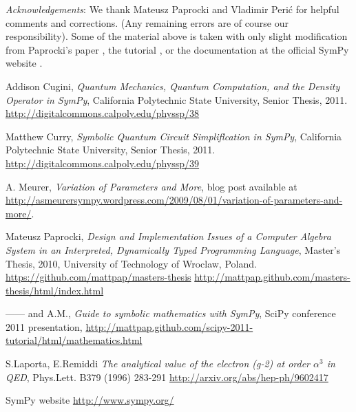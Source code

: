 \documentclass[12pt]{article}
\def\AM{A.M.}
\begin{document}
\noindent
{\it Acknowledgements}:
We thank Mateusz Paprocki and Vladimir Peri\'c
for helpful comments and corrections. (Any remaining errors are of course our
responsibility). Some of the material above is taken
with only slight modification from Paprocki's paper
\cite{P}, the tutorial \cite{PM}, or the documentation at the official SymPy website
\cite{S}.



\begin{thebibliography}{99}

Addison Cugini,
{\it Quantum Mechanics, Quantum Computation, and the Density Operator in SymPy},
California Polytechnic State University, Senior Thesis, 2011.
\newline
\url{http://digitalcommons.calpoly.edu/physsp/38}

Matthew Curry,
{\it Symbolic Quantum Circuit Simpliflcation in SymPy},
California Polytechnic State University, Senior Thesis, 2011.
\newline
\url{http://digitalcommons.calpoly.edu/physsp/39}

 A. Meurer,
{\it Variation of Parameters and More}, blog post available at
\newline
\url{http://asmeurersympy.wordpress.com/2009/08/01/variation-of-parameters-and-more/}.

Mateusz Paprocki,
{\it  Design and Implementation Issues of a Computer Algebra System
in an Interpreted, Dynamically Typed Programming Language},
Master's Thesis, 2010, University of Technology of
Wroclaw,  Poland.
\newline
\url{https://github.com/mattpap/masters-thesis}
\newline
\url{http://mattpap.github.com/masters-thesis/html/index.html}

------ and \AM,
{\it Guide to symbolic mathematics with SymPy},
SciPy conference 2011 presentation,
\newline
\url{http://mattpap.github.com/scipy-2011-tutorial/html/mathematics.html}

S.Laporta, E.Remiddi
{\it The analytical value of the electron (g-2) at order $\alpha^3$ in QED},
Phys.Lett. B379 (1996) 283-291
\newline
\url{http://arxiv.org/abs/hep-ph/9602417}


  SymPy website
\newline
\url{http://www.sympy.org/}



\end{thebibliography}
\end{document}
